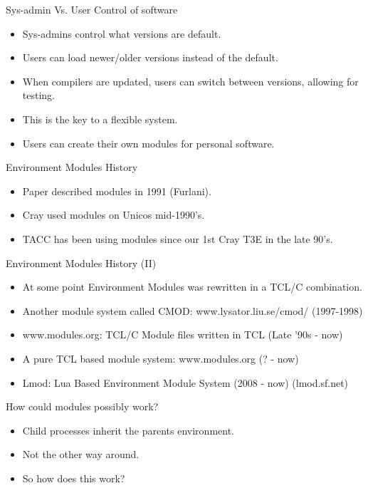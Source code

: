 \documentclass{beamer}
\begin{document}
\begin{frame}{Sys-admin Vs. User Control of software}
  \begin{itemize}
    \item Sys-admins control what versions are default.
    \item Users can load newer/older versions instead of the default.
    \item When compilers are updated, users can switch between
      versions, allowing for testing.
    \item This is the key to a flexible system.
    \item Users can create their own modules for personal software.
  \end{itemize}
\end{frame}

\begin{frame}{Environment Modules History}
  \begin{itemize}
    \item Paper described modules in 1991 (Furlani).
    \item Cray used modules on Unicos mid-1990's.
    \item TACC has been using modules since our 1st Cray T3E in the
      late 90's.
  \end{itemize}
\end{frame}

\begin{frame}{Environment Modules History (II)}
  \begin{itemize}
    \item At some point Environment Modules was rewritten in a TCL/C combination.
    \item Another module system called CMOD:
      www.lysator.liu.se/cmod/ (1997-1998)
    \item www.modules.org: TCL/C Module files written in TCL (Late '90s - now)
    \item A pure TCL based module system: www.modules.org (? - now) 
    \item Lmod: Lua Based Environment Module System (2008 - now) (lmod.sf.net)
  \end{itemize}
\end{frame}

\begin{frame}{How could modules possibly work?}
  \begin{itemize}
    \item Child processes inherit the parents environment.
    \item Not the other way around.
    \item So how does this work?
  \end{itemize}
\end{frame}
\end{document}
